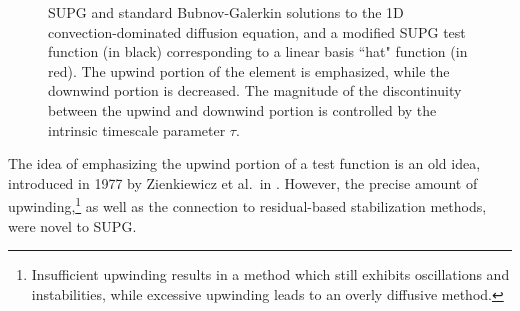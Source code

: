 \documentclass{report}
\begin{document}
\begin{figure}[!h]
\centering
{}
\caption{SUPG and standard Bubnov-Galerkin solutions to the 1D convection-dominated diffusion equation, and a modified SUPG test function (in black) corresponding to a linear basis ``hat" function (in red).  The upwind portion of the element is emphasized, while the downwind portion is decreased.  The magnitude of the discontinuity between the upwind and downwind portion is controlled by the intrinsic timescale parameter $\tau$. }
\label{fig:SUPG}
\end{figure}

The idea of emphasizing the upwind portion of a test function is an old idea, introduced in 1977 by Zienkiewicz et al.\ in \cite{zienkUpwind}.  However, the precise amount of upwinding,\footnote{Insufficient upwinding results in a method which still exhibits oscillations and instabilities, while excessive upwinding leads to an overly diffusive method.} as well as the connection to residual-based stabilization methods, were novel to SUPG.  
\end{document}
